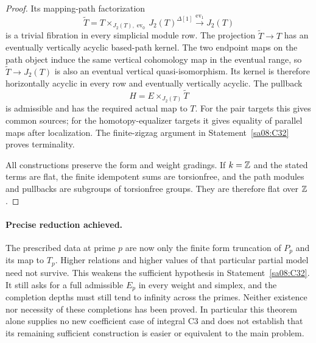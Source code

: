 \begin{proof}
Its mapping-path factorization
\[
 \widetilde T
 =T\mathop{\times}_{J_2(T),\operatorname{ev}_0}J_2(T)^{\Delta[1]}
 \xrightarrow{\operatorname{ev}_1}J_2(T)
\]
is a trivial fibration in every simplicial module row.
The projection $\widetilde T\to T$ has an eventually
vertically acyclic based-path kernel. The two endpoint
maps on the path object induce the same vertical
cohomology map in the eventual range, so
$\widetilde T\to J_2(T)$ is also an eventual vertical
quasi-isomorphism. Its kernel is therefore horizontally
acyclic in every row and eventually vertically acyclic.
The pullback
\[
 H=E\mathop{\times}_{J_2(T)}\widetilde T
\]
is admissible and has the required actual map to $T$.
For the pair targets this gives common sources; for the
homotopy-equalizer targets it gives equality of parallel
maps after localization. The finite-zigzag argument in
Statement~\ref{sa08:C32} proves terminality.

All constructions preserve the form and weight gradings.
If $k=\mathbb Z$ and the stated terms are flat, the finite
idempotent sums are torsionfree, and the path modules
and pullbacks are subgroups of torsionfree groups.
They are therefore flat over $\mathbb Z$.
\end{proof}

\paragraph{Precise reduction achieved.}
The prescribed data at prime $p$ are now only the finite
form truncation of $P_p$ and its map to $T_p$. Higher
relations and higher values of that particular partial
model need not survive. This weakens the sufficient
hypothesis in Statement~\ref{sa08:C32}. It still asks for
a full admissible $E_p$ in every weight and simplex, and
the completion depths must still tend to infinity across
the primes. Neither existence nor necessity of these
completions has been proved. In particular this theorem
alone supplies no new coefficient case of integral C3
and does not establish that its remaining sufficient
construction is easier or equivalent to the main problem.
